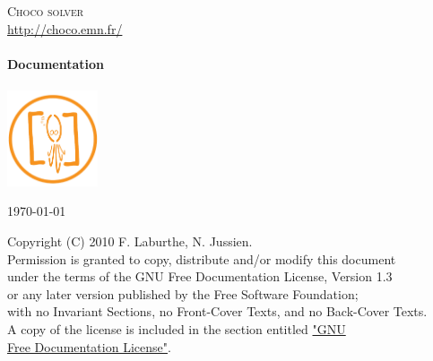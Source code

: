 \begin{titlepage}
\begin{center}
\textsc{\LARGE Choco solver}\\
\url{http://choco.emn.fr/}\\[1.5cm]

\HRule \\[0.4cm]
{ \Huge \bfseries Documentation}\\
\HRule \\[1cm]
\includegraphics[width=0.20\textwidth]{media/logo.pdf} 

\vfill
{\large \today}
\end{center}
\end{titlepage}

\clearpage
{}
\begin{myquote}
Copyright (C)  2010  F. Laburthe, N. Jussien.\\
Permission is granted to copy, distribute and/or modify this document\\
under the terms of the GNU Free Documentation License, Version 1.3\\
or any later version published by the Free Software Foundation;\\
with no Invariant Sections, no Front-Cover Texts, and no Back-Cover Texts.\\
A copy of the license is included in the section entitled \hyperlink{licence}{"GNU \\Free Documentation License"}.
\end{myquote}
